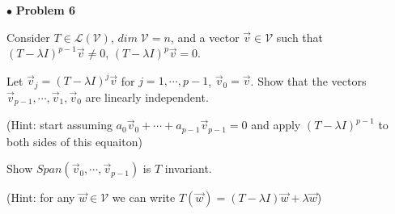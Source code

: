 \documentclass{article}
\begin{document}
\newpage
$ \bullet$ \textbf{Problem 6}
\medskip

\begin{itshape}
Consider $T \in \mathcal{L}(\mathcal{V})$, $dim \; \mathcal{V} =n$, and a vector $\vec{v} \in \mathcal{V}$ such that $(T-\lambda I)^{p-1} \vec{v} \ne 0$, $(T-\lambda I)^p \vec{v} =0$. 

Let $\vec{v}_j=(T-\lambda I)^j \vec{v} $ for $j =1, \cdots, p-1$, $\vec{v}_0=\vec{v}$. Show that the vectors $\vec{v}_{p-1}, \cdots , \vec{v}_1, \vec{v}_0$ are linearly independent.

(Hint: start assuming $a_0 \vec{v}_0 + \cdots + a_{p-1} \vec{v}_{p-1} =0$ and apply $(T-\lambda I)^{p-1}$ to both sides of this equaiton)
\medskip

Show $Span(\vec{v}_0, \cdots, \vec{v}_{p-1})$ is $T$ invariant.

(Hint: for any $\vec{w} \in \mathcal{V}$ we can write $T(\vec{w}) = (T-\lambda I)\vec{w} + \lambda \vec{w}$)
\end{itshape}
\medskip
\end{document}
